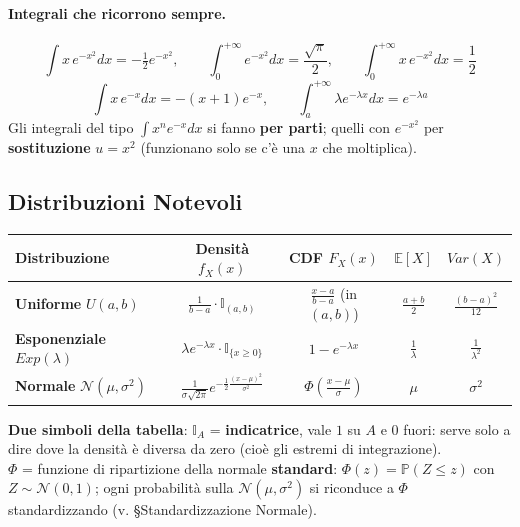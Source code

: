 \documentclass[12pt]{extarticle} %
\begin{document}
\paragraph{Integrali che ricorrono sempre.}
$$ \int x\,e^{-x^2}dx = -\tfrac12 e^{-x^2}, \qquad \int_0^{+\infty} e^{-x^2}dx = \frac{\sqrt{\pi}}{2}, \qquad \int_0^{+\infty} x\,e^{-x^2}dx = \frac12 $$
$$ \int x\,e^{-x}dx = -(x+1)e^{-x}, \qquad \int_a^{+\infty} \lambda e^{-\lambda x}dx = e^{-\lambda a} $$
{\footnotesize Gli integrali del tipo $\int x^n e^{-x}dx$ si fanno \textbf{per parti}; quelli con $e^{-x^2}$ per \textbf{sostituzione} $u = x^2$ (funzionano solo se c'è una $x$ che moltiplica).}

\subsection{Distribuzioni Notevoli}
\begin{center}
\renewcommand{\arraystretch}{1.5}
\begin{tabular}{|l|c|c|c|c|}
\hline
\textbf{Distribuzione} & \textbf{Densità } $f_X(x)$ & \textbf{CDF } $F_X(x)$ & $\mathbb{E}[X]$ & $Var(X)$ \\ \hline
\textbf{Uniforme} $U(a,b)$ & $\frac{1}{b-a} \cdot \mathbb{I}_{(a,b)}$ & $\frac{x-a}{b-a}$ (in $(a,b)$) & $\frac{a+b}{2}$ & $\frac{(b-a)^2}{12}$ \\ \hline
\textbf{Esponenziale} $Exp(\lambda)$ & $\lambda e^{-\lambda x} \cdot \mathbb{I}_{\{x \ge 0\}}$ & $1 - e^{-\lambda x}$ & $\frac{1}{\lambda}$ & $\frac{1}{\lambda^2}$ \\ \hline
\textbf{Normale} $\mathcal{N}(\mu, \sigma^2)$ & $\frac{1}{\sigma\sqrt{2\pi}} e^{-\frac{1}{2}\frac{(x-\mu)^2}{\sigma^2}}$ & $\Phi\left(\frac{x-\mu}{\sigma}\right)$ & $\mu$ & $\sigma^2$ \\ \hline
\end{tabular}
\end{center}
{\footnotesize \textbf{Due simboli della tabella}: $\mathbb{I}_A$ = \textbf{indicatrice}, vale $1$ su $A$ e $0$ fuori: serve solo a dire dove la densità è diversa da zero (cioè gli estremi di integrazione). \\ $\Phi$ = funzione di ripartizione della normale \textbf{standard}: $\Phi(z) = \mathbb{P}(Z \le z)$ con $Z \sim \mathcal{N}(0,1)$; ogni probabilità sulla $\mathcal{N}(\mu,\sigma^2)$ si riconduce a $\Phi$ standardizzando (v. §Standardizzazione Normale).}
\end{document}
